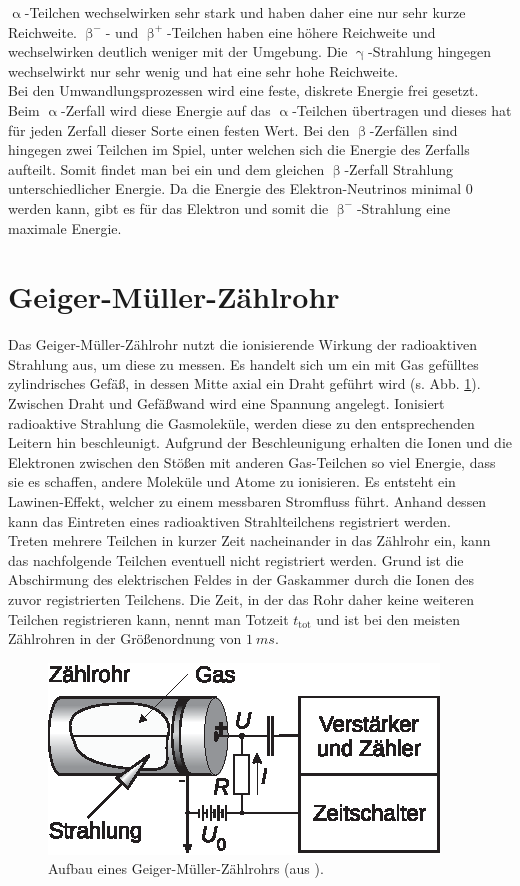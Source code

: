 $\upalpha$-Teilchen wechselwirken sehr stark und haben daher eine nur sehr kurze Reichweite. $\upbeta^-$- und $\upbeta^+$-Teilchen haben eine höhere Reichweite und wechselwirken deutlich weniger mit der Umgebung. Die $\upgamma$-Strahlung hingegen wechselwirkt nur sehr wenig und hat eine sehr hohe Reichweite.\\
Bei den Umwandlungsprozessen wird eine feste, diskrete Energie frei gesetzt. Beim $\upalpha$-Zerfall wird diese Energie auf das $\upalpha$-Teilchen übertragen und dieses hat für jeden Zerfall dieser Sorte einen festen Wert. Bei den $\upbeta$-Zerfällen sind hingegen zwei Teilchen im Spiel, unter welchen sich die Energie des Zerfalls aufteilt. Somit findet man bei ein und dem gleichen $\upbeta$-Zerfall Strahlung unterschiedlicher Energie. Da die Energie des Elektron-Neutrinos minimal 0 werden kann, gibt es für das Elektron und somit die $\upbeta^-$-Strahlung eine maximale Energie. \cite{EKS07}

\section{Geiger-Müller-Zählrohr}
Das Geiger-Müller-Zählrohr nutzt die ionisierende Wirkung der radioaktiven Strahlung aus, um diese zu messen. Es handelt sich um ein mit Gas gefülltes zylindrisches Gefäß, in dessen Mitte axial ein Draht geführt wird (s. Abb. \ref{fig:i_03_geigermueller}). Zwischen Draht und Gefäßwand wird eine Spannung angelegt. Ionisiert radioaktive Strahlung die Gasmoleküle, werden diese zu den entsprechenden Leitern hin beschleunigt. Aufgrund der Beschleunigung erhalten die Ionen und die Elektronen zwischen den Stößen mit anderen Gas-Teilchen so viel Energie, dass sie es schaffen, andere Moleküle und Atome zu ionisieren. Es entsteht ein Lawinen-Effekt, welcher zu einem messbaren Stromfluss führt. Anhand dessen kann das Eintreten eines radioaktiven Strahlteilchens registriert werden.\\
Treten mehrere Teilchen in kurzer Zeit nacheinander in das Zählrohr ein, kann das nachfolgende Teilchen eventuell nicht registriert werden. Grund ist die Abschirmung des elektrischen Feldes in der Gaskammer durch die Ionen des zuvor registrierten Teilchens. Die Zeit, in der das Rohr daher keine weiteren Teilchen registrieren kann, nennt man Totzeit $t_\mathrm{tot}$ und ist bei den meisten Zählrohren in der Größenordnung von $\SI{1}{ms}$.

\begin{figure}[tb]
\centering
\includegraphics{fig/i_03_geigermueller.eps}
\caption{Aufbau eines Geiger-Müller-Zählrohrs (aus \cite[S. 514]{EKS07}).}
\label{fig:i_03_geigermueller}
\end{figure}

